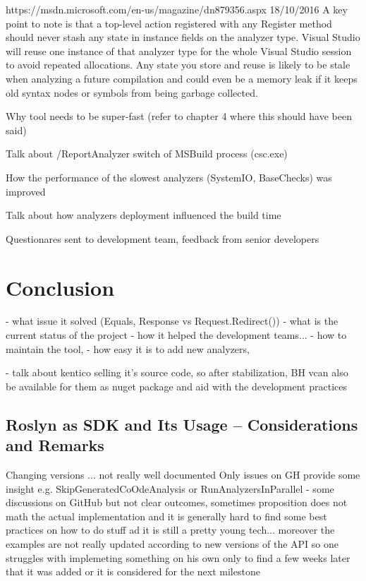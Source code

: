 \documentclass[
  digital, %
  table,   %
  lof,     %
  lot,     %
  oneside,
]{fithesis3}
\begin{document}
https://msdn.microsoft.com/en-us/magazine/dn879356.aspx 18/10/2016
A key point to note is that a top-level action registered with any Register method should never stash any state in instance fields on the analyzer type. Visual Studio will reuse one instance of that analyzer type for the whole Visual Studio session to avoid repeated allocations. Any state you store and reuse is likely to be stale when analyzing a future compilation and could even be a memory leak if it keeps old syntax nodes or symbols from being garbage collected.

Why tool needs to be super-fast (refer to chapter 4 where this should have been said)

Talk about /ReportAnalyzer switch of MSBuild process (csc.exe)

How the performance of the slowest analyzers (SystemIO, BaseChecks) was improved

Talk about how analyzers deployment influenced the build time

Questionares sent to development team, feedback from senior developers

\chapter{Conclusion}
  - what issue it solved (Equals, Response vs Request.Redirect())
  - what is the current status of the project
  - how it helped the development teams...
  - how to maintain the tool, 
  - how easy it is to add new analyzers, 

- talk about kentico selling it's source code, so after stabilization, BH vcan also be available for them as nuget package and aid with the development practices 

\section{Roslyn as SDK and Its Usage -- Considerations and Remarks}
Changing versions ... not really well documented
Only issues on GH provide some insight
e.g. SkipGeneratedCoOdeAnalysis or RunAnalyzersInParallel - some discussions on GitHub but not clear outcomes, sometimes proposition does not math the actual implementation and it is generally hard to find some best practices on how to do stuff ad it is still a pretty young tech... moreover the examples are not really updated according to new versions of the API so one struggles with implemeting something on his own only to find a few weeks later that it was added or it is considered for the next milestone
\end{document}
